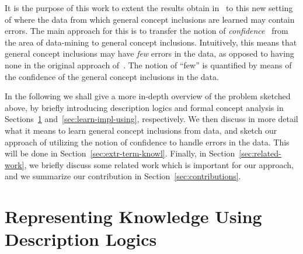 It is the purpose of this work to extent the results obtain in~\cite{Diss-Felix} to this
new setting of where the data from which general concept inclusions are learned may
contain errors.  The main approach for this is to transfer the notion of
\emph{confidence}~\cite{arules:agrawal:association-rules} from the area of data-mining to
general concept inclusions.  Intuitively, this means that general concept inclusions may
have \emph{few} errors in the data, as opposed to having none in the original approach
of~\cite{Diss-Felix}.  The notion of ``few'' is quantified by means of the confidence of
the general concept inclusions in the data.

In the following we shall give a more in-depth overview of the problem sketched above, by
briefly introducing description logics and formal concept analysis in
Sections~\ref{sec:repr-knowl-using} and~\ref{sec:learn-impl-using}, respectively.  We then
discuss in more detail what it means to learn general concept inclusions from data, and
sketch our approach of utilizing the notion of confidence to handle errors in the data.
This will be done in Section~\ref{sec:extr-term-knowl}.  Finally, in
Section~\ref{sec:related-work}, we briefly discuss some related work which is important
for our approach, and we summarize our contribution in Section~\ref{sec:contributions}.

\section{Representing Knowledge Using Description Logics}
\label{sec:repr-knowl-using}

%




